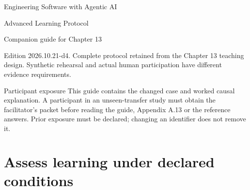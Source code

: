 \documentclass[english,fontsize=10pt,openany,oneside,bibliography=totoc,numbers=noenddot,headings=small,parskip=half-]{scrbook}
\begin{document}
\raggedbottom
\begin{titlepage}
\raggedright
\vspace*{20mm}
{\Huge Engineering Software with Agentic AI\par}
\vspace{12mm}
{\LARGE Advanced Learning Protocol\par}
\vspace{8mm}
{\Large Companion guide for Chapter 13\par}
\vfill
Edition 2026.10.21-d4. Complete protocol retained from the Chapter 13 teaching design. Synthetic rehearsal and actual human participation have different evidence requirements.\par
\end{titlepage}
\begin{warningbox}{Participant exposure}
This guide contains the changed case and worked causal explanation. A participant in an unseen-transfer study must obtain the facilitator's packet before reading the guide, Appendix A.13 or the reference answers. Prior exposure must be declared; changing an identifier does not remove it.
\end{warningbox}
\tableofcontents
\chapter{Assess learning under declared conditions}

\begingroup\footnotesize\sloppy
\printbibliography[title={References}]
\endgroup
\end{document}
